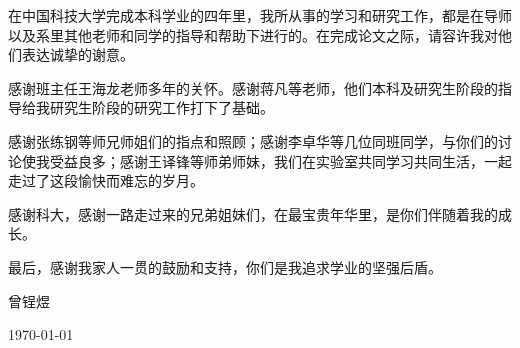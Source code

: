 \begin{acknowledgements}

在中国科技大学完成本科学业的四年里，我所从事的学习和研究工作，都是在导师以及系里其他老师和同学的指导和帮助下进行的。在完成论文之际，请容许我对他们表达诚挚的谢意。

感谢班主任王海龙老师多年的关怀。感谢蒋凡等老师，他们本科及研究生阶段的指导给我研究生阶段的研究工作打下了基础。

感谢张练钢等师兄师姐们的指点和照顾；感谢李卓华等几位同班同学，与你们的讨论使我受益良多；感谢王译锋等师弟师妹，我们在实验室共同学习共同生活，一起走过了这段愉快而难忘的岁月。

感谢科大，感谢一路走过来的兄弟姐妹们，在最宝贵年华里，是你们伴随着我的成长。

最后，感谢我家人一贯的鼓励和支持，你们是我追求学业的坚强后盾。

\vskip 18pt

\begin{flushright}

曾锃煜

\today

\end{flushright}
\end{acknowledgements}
